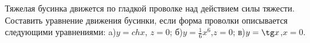 Тяжелая бусинка движется по гладкой проволке над действием силы тяжести.
Составить уравнение движения бусинки, если форма проволки описывается
следующими уравнениями: 
a)$y=chx$, $z=0$;
б)$y=\frac{1}{6}x^6$,$z=0$;
в)$y=\tg x$,$x=0$.
